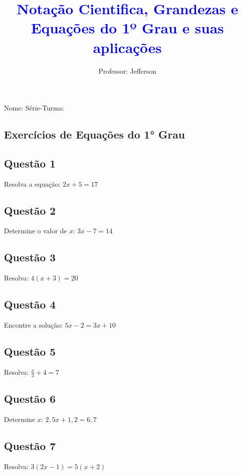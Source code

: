 \documentclass[11pt]{extarticle} %
\title{\textcolor{blue}{Notação Cientifica, Grandezas e Equações do 1º Grau e suas aplicações}}
\author{Professor: Jefferson}
\date{}
\begin{document}
\maketitle
\vspace{-1cm}

\begin{center}
\large{Nome: \underline{\hspace{8cm}} \quad Série-Turma: \underline{\hspace{3cm}}}
\end{center}

\begin{multicols}{2}

\section*{Exercícios de Equações do 1° Grau}

\subsection*{Questão 1}
Resolva a equação: \( 2x + 5 = 17 \)

\subsection*{Questão 2}
Determine o valor de \( x \): \( 3x - 7 = 14 \)

\subsection*{Questão 3}
Resolva: \( 4(x + 3) = 20 \)

\subsection*{Questão 4}
Encontre a solução: \( 5x - 2 = 3x + 10 \)

\subsection*{Questão 5}
Resolva: \( \frac{x}{3} + 4 = 7 \)

\subsection*{Questão 6}
Determine \( x \): \( 2,5x + 1,2 = 6,7 \)

\subsection*{Questão 7}
Resolva: \( 3(2x - 1) = 5(x + 2) \)


\end{multicols}
\end{document}
